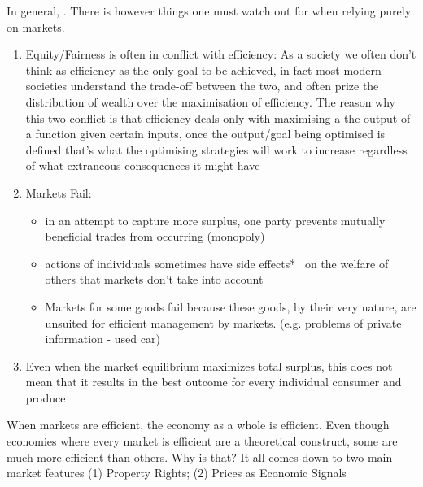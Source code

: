 \documentclass[english,course,draft]{Notes}
\begin{document}
\par{In general, . There is however things one must watch out for when relying purely on markets.}

\begin{enumerate}
	\item Equity/Fairness is often in conflict with efficiency: As a society we often don't think as efficiency as the only goal to be achieved, in fact most modern societies understand the trade-off between the two, and often prize the distribution of wealth over the maximisation of efficiency. The reason why this two conflict is that efficiency deals only with maximising a the output of a function given certain inputs, once the output/goal being optimised is defined that's what the optimising strategies will work to increase regardless of what extraneous consequences it might have
	
	\item Markets Fail: 
		\begin{itemize}
		\item in an attempt to capture more surplus, one party prevents mutually beneficial trades from occurring (monopoly)
		\item actions of individuals sometimes have side effects*~ on the welfare of others that markets don't take into account
		\item Markets for some goods fail because these goods, by their very nature, are unsuited for efficient management by markets. (e.g. problems of private information - used car)
		\end{itemize}
		
	\item Even when the market equilibrium maximizes total surplus, this does not mean that it results in the best outcome for every individual consumer and produce
\end{enumerate}

\par{When markets are efficient, the economy as a whole is efficient. Even though economies where every market is efficient are a theoretical construct, some are much more efficient than others. Why is that? It all comes down to two main market features (1) Property Rights; (2) Prices as Economic Signals }

\end{document}
